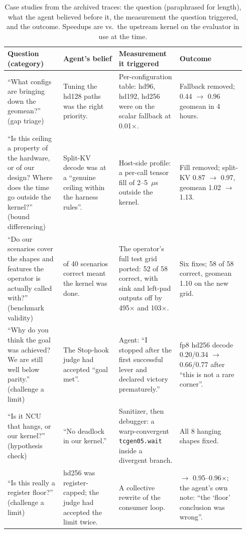 
\begin{table}[tbp]
\centering\small
\caption{Case studies from the archived traces: the question (paraphrased for length), what the
agent believed before it, the measurement the question triggered, and the outcome. Speedups are
vs.\ the upstream kernel on the evaluator in use at the time.}
\label{kernelseek:tab:cases}
\setlength{\tabcolsep}{4pt}
\begin{tabular}{@{}>{\raggedright\arraybackslash}p{0.22\linewidth}>{\raggedright\arraybackslash}p{0.22\linewidth}>{\raggedright\arraybackslash}p{0.24\linewidth}>{\raggedright\arraybackslash}p{0.26\linewidth}@{}}
\toprule
Question (category) & Agent's belief & Measurement it triggered & Outcome \\
\midrule
``What configs are bringing down the geomean?'' (gap triage) &
Tuning the hd128 paths was the right priority. &
Per-configuration table: hd96, hd192, hd256 were on the scalar fallback at 0.01$\times$. &
Fallback removed; 0.44 $\to$ 0.96 geomean in 4 hours. \\
\addlinespace
``Is this ceiling a property of the hardware, or of our design? Where does the time go outside the kernel?'' (bound differencing) &
Split-KV decode was at a ``genuine ceiling within the harness rules''. &
Host-side profile: a per-call tensor fill of 2--5~$\mu$s outside the kernel. &
Fill removed; split-KV 0.87 $\to$ 0.97, geomean 1.02 $\to$ 1.13. \\
\addlinespace
``Do our scenarios cover the shapes and features the operator is actually called with?'' (benchmark validity) &
40 of 40 scenarios correct meant the kernel was done. &
The operator's full test grid ported: 52 of 58 correct, with sink and left-pad outputs off by 495$\times$ and 103$\times$. &
Six fixes; 58 of 58 correct, geomean 1.10 on the new grid. \\
\addlinespace
``Why do you think the goal was achieved? We are still well below parity.'' (challenge a limit) &
The Stop-hook judge had accepted ``goal met''. &
Agent: ``I stopped after the first successful lever and declared victory prematurely.'' &
fp8 hd256 decode 0.20/0.34 $\to$ 0.66/0.77 after ``this is not a rare corner''. \\
\addlinespace
``Is it NCU that hangs, or our kernel?'' (hypothesis check) &
``No deadlock in our kernel.'' &
Sanitizer, then debugger: a warp-convergent \texttt{tcgen05.wait} inside a divergent branch. &
All 8 hanging shapes fixed. \\
\addlinespace
``Is this really a register floor?'' (challenge a limit) &
hd256 was register-capped; the judge had accepted the limit twice. &
A collective rewrite of the consumer loop. &
0.84 $\to$ 0.95--0.96$\times$; the agent's own note: ``the `floor' conclusion was wrong''. \\
\bottomrule
\end{tabular}
\end{table}

